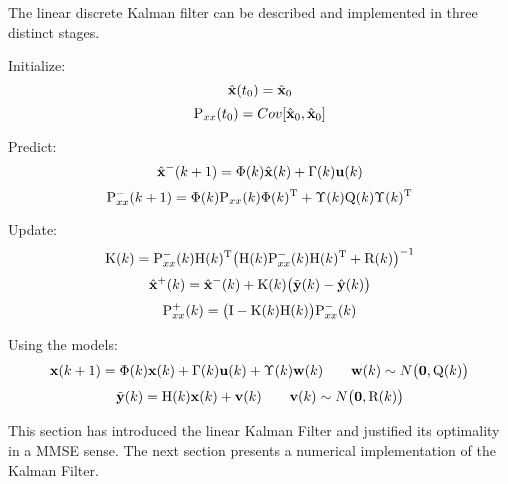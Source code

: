 The linear discrete Kalman filter can be described and implemented in three distinct stages.

Initialize:
\begin{equation}
\xhat(t_0)=\xhat_0 
\end{equation}
\begin{equation}
\Pxx(t_0)=Cov[\xhat_0,\xhat_0]
\end{equation}

Predict:
\begin{equation}
\xprior\kone  =\Phik\xkhat+\Gammak\uk
\end{equation}
\begin{equation}
\Pxx\prior\kone =\Phik\Pxx\k\Phik\trans +\Upsilonk\Qk\Upsilonk\trans
\end{equation}

Update:
\begin{equation}
\Kk =\Pxx\prior\k\Hk\trans\big(\Hk\Pxx\prior\k\Hk\trans+\Rk\big)^{-1}
\end{equation}
\begin{equation}
\xpost\k = \xprior\k + \Kk\big(\yktilde-\ykhat\big) 
\end{equation}
\begin{equation}
\Pxx\post\k=\big(\mathrm{I}-\Kk\Hk\big)\Pxx\prior\k
\end{equation}

Using the models:
\begin{equation}
\xkone=\Phik\xk+\Gammak\uk + \Upsilonk\wk \qquad \wk\sim N\big(\mathbf{0},\Qk\big)
\end{equation}
\begin{equation}
\yktilde=\Hk\xk+\vk \qquad \vk\sim N\big(\mathbf{0},\Rk\big)
\end{equation}

This section has introduced the linear Kalman Filter and justified its optimality in a MMSE sense.
The next section presents a numerical implementation of the Kalman Filter.